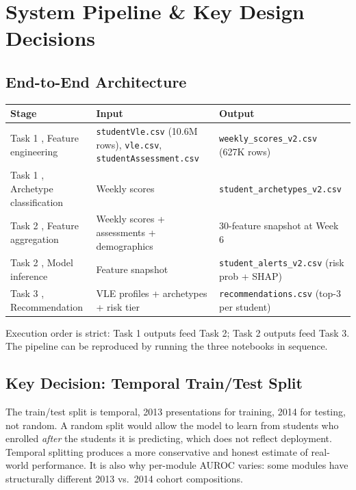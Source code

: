 \documentclass[10pt,a4paper]{article}
\begin{document}
\newpage


\section{System Pipeline \& Key Design Decisions}

\subsection{End-to-End Architecture}

\begin{center}
\small
\begin{tabularx}{\linewidth}{@{}lLL@{}}
\toprule
\textbf{Stage} & \textbf{Input} & \textbf{Output} \\
\midrule
Task 1 , Feature engineering & \texttt{studentVle.csv} (10.6M rows), \texttt{vle.csv}, \texttt{studentAssessment.csv} & \texttt{weekly\_scores\_v2.csv} (627K rows) \\
Task 1 , Archetype classification & Weekly scores & \texttt{student\_archetypes\_v2.csv} \\
Task 2 , Feature aggregation & Weekly scores + assessments + demographics & 30-feature snapshot at Week 6 \\
Task 2 , Model inference & Feature snapshot & \texttt{student\_alerts\_v2.csv} (risk prob + SHAP) \\
Task 3 , Recommendation & VLE profiles + archetypes + risk tier & \texttt{recommendations.csv} (top-3 per student) \\
\bottomrule
\end{tabularx}
\end{center}

Execution order is strict: Task 1 outputs feed Task 2; Task 2 outputs feed Task 3. The pipeline can be reproduced by running the three notebooks in sequence.

\subsection{Key Decision: Temporal Train/Test Split}

The train/test split is temporal, 2013 presentations for training, 2014 for testing, not
random. A random split would allow the model to learn from students who enrolled
\emph{after} the students it is predicting, which does not reflect deployment. Temporal
splitting produces a more conservative and honest estimate of real-world performance. It is
also why per-module AUROC varies: some modules have structurally different 2013 vs.\ 2014
cohort compositions.
\end{document}
